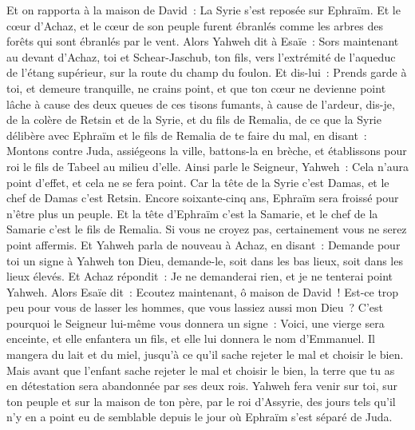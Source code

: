 \begin{multicols}{2}
Et on rapporta à la maison de David~: La Syrie s'est reposée sur Ephraïm. Et le cœur d'Achaz, et le cœur de son peuple furent ébranlés comme les arbres des forêts qui sont ébranlés par le vent.
Alors Yahweh dit à Esaïe~: Sors maintenant au devant d'Achaz, toi et Schear-Jaschub, ton fils, vers l'extrémité de l'aqueduc de l'étang supérieur, sur la route du champ du foulon.
Et dis-lui~: Prends garde à toi, et demeure tranquille, ne crains point, et que ton cœur ne devienne point lâche à cause des deux queues de ces tisons fumants, à cause de l'ardeur, dis-je, de la colère de Retsin et de la Syrie, et du fils de Remalia,
de ce que la Syrie délibère avec Ephraïm et le fils de Remalia de te faire du mal, en disant~:
Montons contre Juda, assiégeons la ville, battons-la en brèche, et établissons pour roi le fils de Tabeel au milieu d'elle.
Ainsi parle le Seigneur, Yahweh~: Cela n'aura point d'effet, et cela ne se fera point.
Car la tête de la Syrie c'est Damas, et le chef de Damas c'est Retsin. Encore soixante-cinq ans, Ephraïm sera froissé pour n'être plus un peuple.
Et la tête d'Ephraïm c'est la Samarie, et le chef de la Samarie c'est le fils de Remalia. Si vous ne croyez pas, certainement vous ne serez point affermis.
Et Yahweh parla de nouveau à Achaz, en disant~:
Demande pour toi un signe à Yahweh ton Dieu, demande-le, soit dans les bas lieux, soit dans les lieux élevés.
Et Achaz répondit~: Je ne demanderai rien, et je ne tenterai point Yahweh.
Alors Esaïe dit~: Ecoutez maintenant, ô maison de David~! Est-ce trop peu pour vous de lasser les hommes, que vous lassiez aussi mon Dieu~?
C'est pourquoi le Seigneur lui-même vous donnera un signe~: Voici, une vierge sera enceinte, et elle enfantera un fils, et elle lui donnera le nom d'Emmanuel.
Il mangera du lait et du miel, jusqu'à ce qu'il sache rejeter le mal et choisir le bien.
Mais avant que l'enfant sache rejeter le mal et choisir le bien, la terre que tu as en détestation sera abandonnée par ses deux rois.
Yahweh fera venir sur toi, sur ton peuple et sur la maison de ton père, par le roi d'Assyrie, des jours tels qu'il n'y en a point eu de semblable depuis le jour où Ephraïm s'est séparé de Juda.

\end{multicols}
